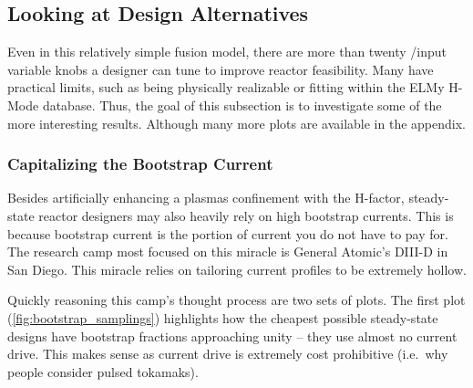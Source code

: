 \subsection{Looking at Design Alternatives}

Even in this relatively simple fusion model, there are more than twenty /input variable knobs a designer can tune to improve reactor feasibility. Many have practical limits, such as being physically realizable or fitting within the ELMy H-Mode database. Thus, the goal of this subsection is to investigate some of the more interesting results. Although many more plots are available in the appendix.

\subsubsection{Capitalizing the Bootstrap Current}

Besides artificially enhancing a plasmas confinement with the H-factor, steady-state reactor designers may also heavily rely on high bootstrap currents. This is because bootstrap current is the portion of current you do not have to pay for. The research camp most focused on this miracle is General Atomic's DIII-D in San Diego. This miracle relies on tailoring current profiles to be extremely hollow.

Quickly reasoning this camp's thought process are two sets of plots. The first plot (\cref{fig:bootstrap_samplings}) highlights how the cheapest possible steady-state designs have bootstrap fractions approaching unity -- they use almost no current drive. This makes sense as current drive is extremely cost prohibitive (i.e.\ why people consider pulsed tokamaks).

